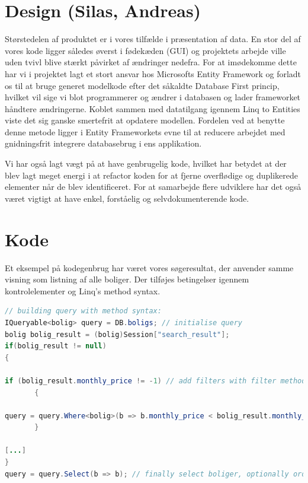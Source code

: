 \documentclass[12pt, a4paper]{report}
\begin{document}
\section{Design (Silas, Andreas)}
Størstedelen af produktet er i vores tilfælde i præsentation af data. En stor del af vores kode ligger således øverst i fødekæden (GUI) og projektets arbejde ville uden tvivl blive stærkt påvirket af ændringer nedefra. For at imødekomme dette har vi i projektet lagt et stort ansvar hos Microsofts Entity Framework og forladt os til at bruge generet modelkode efter det såkaldte Database First princip, hvilket vil sige vi blot programmerer og ændrer i databasen og lader frameworket håndtere ændringerne.
Koblet sammen med datatilgang igennem Linq to Entities viste det sig ganske smertefrit at opdatere modellen. Fordelen ved at benytte denne metode ligger i Entity Frameworkets evne til at reducere arbejdet med gnidningsfrit integrere databasebrug i ens applikation.

Vi har også lagt vægt på at have genbrugelig kode, hvilket har betydet at der blev lagt meget energi i at refactor koden for at fjerne overflødige og duplikerede elementer når de blev identificeret. For at samarbejde flere udviklere har det også været vigtigt at have enkel, forståelig og selvdokumenterende kode.

\section{Kode}
Et eksempel på kodegenbrug har været vores søgeresultat, der anvender samme visning som listning af alle boliger. Der tilføjes betingelser igennem kontrolelementer og Linq’s method syntax.
\begin{lstlisting}[basicstyle=\tiny, columns=fullflexible, language=java, frame=single]
// building query with method syntax:
IQueryable<bolig> query = DB.boligs; // initialise query
bolig bolig_result = (bolig)Session["search_result"];
if(bolig_result != null)
{

if (bolig_result.monthly_price != -1) // add filters with filter methods
       {

query = query.Where<bolig>(b => b.monthly_price < bolig_result.monthly_price);
       }

[...]
}
query = query.Select(b => b); // finally select boliger, optionally order etc.
\end{lstlisting}
\end{document}
